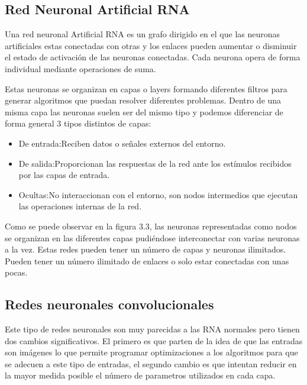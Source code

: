 \subsection{Red Neuronal Artificial RNA}

Una red neuronal Artificial RNA es un grafo dirigido en el que las neuronas artificiales estas conectadas con otras y los enlaces pueden aumentar o disminuir el estado de activación de las neuronas conectadas. Cada neurona opera de forma individual mediante operaciones de suma.

Estas neuronas se organizan en capas o layers formando diferentes filtros para generar algoritmos que puedan resolver diferentes problemas. Dentro de una misma capa las neuronas suelen ser del mismo tipo y podemos diferenciar de forma general 3 tipos distintos de capas:

\begin{itemize}
	\item{De entrada}:Reciben datos o señales externos del entorno.
	\item{De salida}:Proporcionan las respuestas de la red ante los estímulos recibidos por las capas de entrada.
	\item{Ocultas}:No interaccionan con el entorno, son nodos intermedios que ejecutan las operaciones internas de la red.
\end{itemize}



Como se puede observar en la figura 3.3, las neuronas representadas como nodos se organizan en las diferentes capas pudiéndose interconectar con varias neuronas a la vez. Estas redes pueden tener un número de capas y neuronas ilimitados. Pueden tener un número ilimitado de enlaces o solo estar conectadas con unas pocas.

\subsection{Redes neuronales convolucionales}

Este tipo de redes neuronales son muy parecidas a las RNA normales pero tienen dos cambios significativos. El primero es que parten de la idea de que las entradas son imágenes lo que permite programar optimizaciones a los algoritmos para que se adecuen a este tipo de entradas, el segundo cambio es que intentan reducir en la mayor medida posible el número de parametros utilizados en cada capa.


